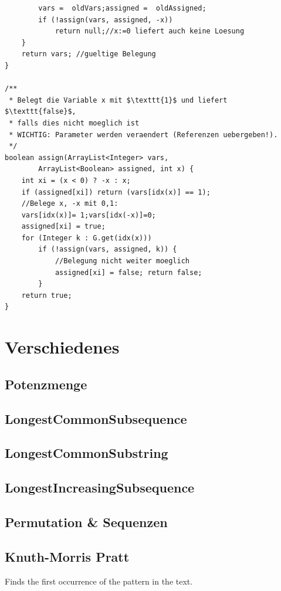 \documentclass[10pt,a4paper,ngerman,oneside,]{article}
\begin{document}
\begin{multicols}{2}
\begin{lstlisting}
		vars =  oldVars;assigned =  oldAssigned;
		if (!assign(vars, assigned, -x)) 
			return null;//x:=0 liefert auch keine Loesung
	}
	return vars; //gueltige Belegung
}

/**
 * Belegt die Variable x mit $\texttt{1}$ und liefert $\texttt{false}$, 
 * falls dies nicht moeglich ist
 * WICHTIG: Parameter werden veraendert (Referenzen uebergeben!). 
 */
boolean assign(ArrayList<Integer> vars,
		ArrayList<Boolean> assigned, int x) {
	int xi = (x < 0) ? -x : x;
	if (assigned[xi]) return (vars[idx(x)] == 1);
	//Belege x, -x mit 0,1:
	vars[idx(x)]= 1;vars[idx(-x)]=0;
	assigned[xi] = true;
	for (Integer k : G.get(idx(x))) 
		if (!assign(vars, assigned, k)) {
			//Belegung nicht weiter moeglich
			assigned[xi] = false; return false; 
		}
	return true;
}
\end{lstlisting}
\section{Verschiedenes}
\subsection{Potenzmenge}

\subsection{LongestCommonSubsequence}

\subsection{LongestCommonSubstring}

\subsection{LongestIncreasingSubsequence}

\subsection{Permutation \& Sequenzen}

\subsection{Knuth-Morris Pratt}
Finds the first occurrence of the pattern in the text.
\end{multicols}
\end{document}
